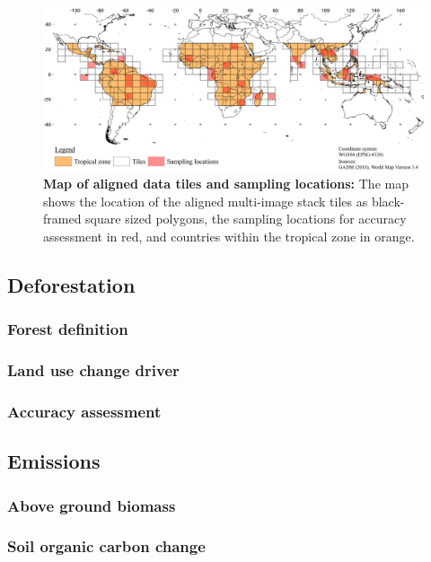 		\begin{figure}[ht]
			\centering
			\includegraphics[scale=.97]{img/method_overview_frameless}
			\caption[Map of aligned data tiles and sampling locations]{\textbf{Map of aligned data tiles and sampling locations:} The map shows the location of the aligned multi-image stack tiles as black-framed square sized polygons, the sampling locations for accuracy assessment in red, and countries within the tropical zone in orange.}
			\label{fig:processing}
		\end{figure}

	\subsection{Deforestation}
		\subsubsection{Forest definition}
			\lipsum[1-2]
		\subsubsection{Land use change driver}
			\lipsum[1-2]
		\subsubsection{Accuracy assessment}
			\lipsum[1-2]

	\subsection{Emissions}
		\subsubsection{Above ground biomass}
			\lipsum[1-2]
		\subsubsection{Soil organic carbon change}
			\lipsum[1-2]

